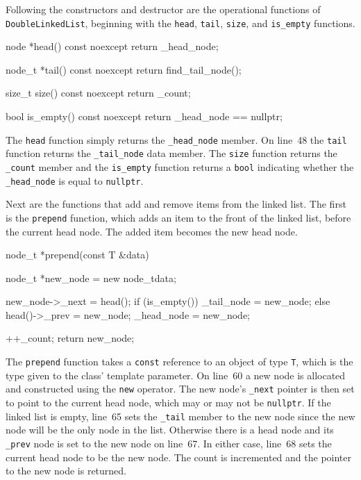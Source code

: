 \documentclass{article}
\begin{document}
  Following the constructors and destructor are the operational functions of \verb|DoubleLinkedList|, beginning with the \verb|head|, \verb|tail|, \verb|size|, and \verb|is_empty| functions.

  \begin{lstcpp}
  node *head() const noexcept {
    return _head_node;
  }

  node_t *tail() const noexcept {
    return find_tail_node();
  }

  size_t size() const noexcept {
      return _count;
  }

  bool is_empty() const noexcept {
    return _head_node == nullptr;
  }\end{lstcpp}
  The \verb|head| function simply returns the \verb|_head_node| member. On line~48 the \verb|tail| function returns the \verb|_tail_node| data member. The \verb|size| function returns the \verb|_count| member and the \verb|is_empty| function returns a \verb|bool| indicating whether the \verb|_head_node| is equal to \verb|nullptr|.

  Next are the functions that add and remove items from the linked list.
  The first is the \verb|prepend| function, which adds an item to the front of the linked list, before the current head node. The added item becomes the new head node.
  \begin{lstcpp}
  node_t *prepend(const T &data) {
    node_t *new_node = new node_t{data};

    new_node->_next = head();
    if (is_empty())
        _tail_node = new_node;
    else
        head()->_prev = new_node;
    _head_node = new_node;

    ++_count;
    return new_node;
  }\end{lstcpp}
  The \verb|prepend| function takes a \verb|const| reference to an object of type \verb|T|, which is the type given to the class' template parameter. On line~60 a new node is allocated and constructed using the \verb|new| operator. The new node's \verb|_next| pointer is then set to point to the current head node, which may or may not be \verb|nullptr|. If the linked list is empty, line~65 sets the \verb|_tail| member to the new node since the new node will be the only node in the list. Otherwise there is a head node and its \verb|_prev| node is set to the new node on line~67. In either case, line~68 sets the current head node to be the new node. The count is incremented and the pointer to the new node is returned.
\end{document}
